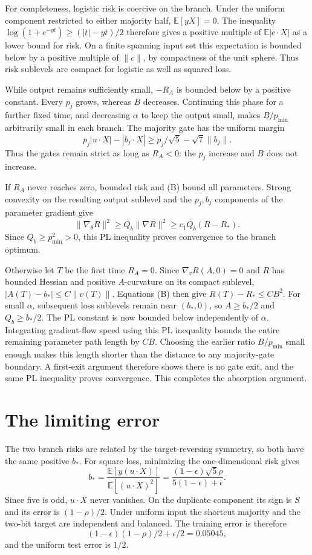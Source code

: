 \documentclass[11pt]{article}
\newcommand{\E}{\mathbb E}\newcommand{\R}{\mathbb R}
\begin{document}
For completeness, logistic risk is coercive on the branch. Under the
uniform component restricted to either majority half,
$\E[yX]=0$. The inequality
$\log(1+e^{-yt})\ge(|t|-yt)/2$ therefore gives a positive multiple of
$\E|c\cdot X|$ as a lower bound for risk. On a finite spanning input
set this expectation is bounded below by a positive multiple of
$\|c\|$, by compactness of the unit sphere. Thus risk sublevels are
compact for logistic as well as squared loss.

While output remains sufficiently small, $-R_A$ is bounded below by a
positive constant. Every $p_j$ grows, whereas $B$ decreases. Continuing
this phase for a further fixed time, and decreasing $\alpha$ to keep the
output small, makes $B/p_{\min}$ arbitrarily small in each branch.
The majority gate has the uniform margin
\[
 p_j|u\cdot X|-|b_j\cdot X|
 \ge p_j/\sqrt5-\sqrt7\|b_j\|.
\]
Thus the gates remain strict as long as $R_A<0$: the $p_j$ increase
and $B$ does not increase.

If $R_A$ never reaches zero, bounded risk and (B) bound all parameters.
Strong convexity on the resulting output sublevel and the $p_j,b_j$
components of the parameter gradient give
\[
 \|\nabla_\theta R\|^2\ge Q_b\|\nabla R\|^2
               \ge c_1 Q_b(R-R_*).
\]
Since $Q_b\ge p_{\min}^2>0$, this PL inequality proves convergence to
the branch optimum.

Otherwise let $T$ be the first time $R_A=0$. Since $\nabla_vR(A,0)=0$
and $R$ has bounded Hessian and positive $A$-curvature on its compact
sublevel, $|A(T)-b_*|\le C\|v(T)\|$. Equations (B) then give
$R(T)-R_*\le C B^2$. For small $\alpha$, subsequent loss sublevels
remain near $(b_*,0)$, so $A\ge b_*/2$ and $Q_b\ge b_*/2$.
The PL constant is now bounded below independently of $\alpha$.
Integrating gradient-flow speed using this PL inequality bounds the
entire remaining parameter path length by $C B$. Choosing the earlier
ratio $B/p_{\min}$ small enough makes this length shorter than the
distance to any majority-gate boundary. A first-exit argument therefore
shows there is no gate exit, and the same PL inequality proves convergence.
This completes the absorption argument.

\section{The limiting error}
The two branch risks are related by the target-reversing symmetry, so
both have the same positive $b_*$. For square loss, minimizing the
one-dimensional risk gives
\[
 b_* = \frac{\E[y(u\cdot X)]}{\E[(u\cdot X)^2]}
      =\frac{(1-\epsilon)\sqrt5\rho}{5(1-\epsilon)+\epsilon}.
\]
Since five is odd, $u\cdot X$ never vanishes. On the duplicate component
its sign is $S$ and its error is $(1-\rho)/2$. Under uniform input the
shortcut majority and the two-bit target are independent and balanced.
The training error is therefore
\[
 (1-\epsilon)(1-\rho)/2+\epsilon/2=0.05045,
\]
and the uniform test error is $1/2$.
\end{document}
